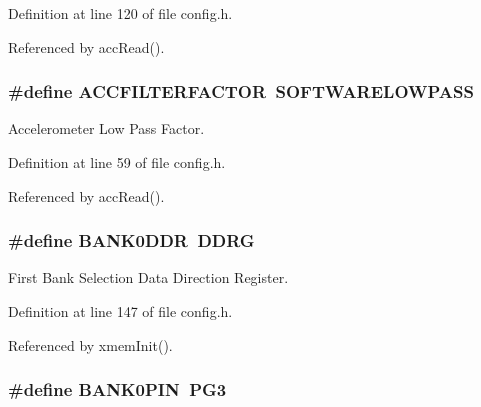 Definition at line 120 of file config.\-h.



Referenced by acc\-Read().

\hypertarget{group__config_gaace41596724b03f3f2b2ee28b7e87272}{
\subsubsection[{A\-C\-C\-F\-I\-L\-T\-E\-R\-F\-A\-C\-T\-O\-R}]{\setlength{\rightskip}{0pt plus 5cm}\#define A\-C\-C\-F\-I\-L\-T\-E\-R\-F\-A\-C\-T\-O\-R~{\bf S\-O\-F\-T\-W\-A\-R\-E\-L\-O\-W\-P\-A\-S\-S}}}\label{group__config_gaace41596724b03f3f2b2ee28b7e87272}


Accelerometer Low Pass Factor. 



Definition at line 59 of file config.\-h.



Referenced by acc\-Read().

\hypertarget{group__config_gafba0bbf9336cfc754622a5e9b3d12d80}{
\subsubsection[{B\-A\-N\-K0\-D\-D\-R}]{\setlength{\rightskip}{0pt plus 5cm}\#define B\-A\-N\-K0\-D\-D\-R~D\-D\-R\-G}}\label{group__config_gafba0bbf9336cfc754622a5e9b3d12d80}


First Bank Selection Data Direction Register. 



Definition at line 147 of file config.\-h.



Referenced by xmem\-Init().

\hypertarget{group__config_gaa176e9b2752f764cd7e7d9fd49d46af8}{
\subsubsection[{B\-A\-N\-K0\-P\-I\-N}]{\setlength{\rightskip}{0pt plus 5cm}\#define B\-A\-N\-K0\-P\-I\-N~P\-G3}}\label{group__config_gaa176e9b2752f764cd7e7d9fd49d46af8}


